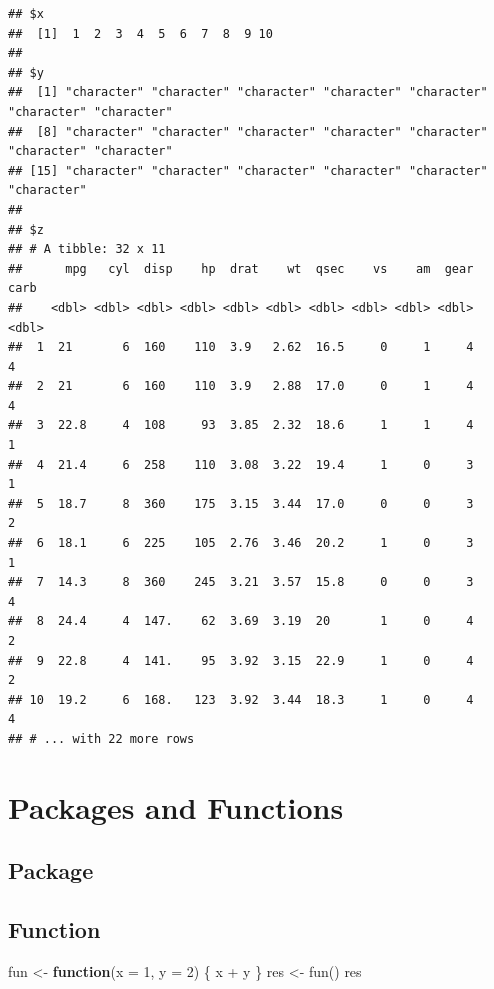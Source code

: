 \documentclass[
]{article}
\newenvironment{Shaded}{\begin{snugshade}}{\end{snugshade}}
\newcommand{\AttributeTok}[1]{\textcolor[rgb]{0.77,0.63,0.00}{#1}}
\newcommand{\ControlFlowTok}[1]{\textcolor[rgb]{0.13,0.29,0.53}{\textbf{#1}}}
\newcommand{\DecValTok}[1]{\textcolor[rgb]{0.00,0.00,0.81}{#1}}
\newcommand{\FunctionTok}[1]{\textcolor[rgb]{0.00,0.00,0.00}{#1}}
\newcommand{\NormalTok}[1]{#1}
\newcommand{\OtherTok}[1]{\textcolor[rgb]{0.56,0.35,0.01}{#1}}
\newcommand{\SpecialCharTok}[1]{\textcolor[rgb]{0.00,0.00,0.00}{#1}}
\begin{document}
\begin{verbatim}
## $x
##  [1]  1  2  3  4  5  6  7  8  9 10
## 
## $y
##  [1] "character" "character" "character" "character" "character" "character" "character"
##  [8] "character" "character" "character" "character" "character" "character" "character"
## [15] "character" "character" "character" "character" "character" "character"
## 
## $z
## # A tibble: 32 x 11
##      mpg   cyl  disp    hp  drat    wt  qsec    vs    am  gear  carb
##    <dbl> <dbl> <dbl> <dbl> <dbl> <dbl> <dbl> <dbl> <dbl> <dbl> <dbl>
##  1  21       6  160    110  3.9   2.62  16.5     0     1     4     4
##  2  21       6  160    110  3.9   2.88  17.0     0     1     4     4
##  3  22.8     4  108     93  3.85  2.32  18.6     1     1     4     1
##  4  21.4     6  258    110  3.08  3.22  19.4     1     0     3     1
##  5  18.7     8  360    175  3.15  3.44  17.0     0     0     3     2
##  6  18.1     6  225    105  2.76  3.46  20.2     1     0     3     1
##  7  14.3     8  360    245  3.21  3.57  15.8     0     0     3     4
##  8  24.4     4  147.    62  3.69  3.19  20       1     0     4     2
##  9  22.8     4  141.    95  3.92  3.15  22.9     1     0     4     2
## 10  19.2     6  168.   123  3.92  3.44  18.3     1     0     4     4
## # ... with 22 more rows
\end{verbatim}

\hypertarget{packages-and-functions}{%
\section{Packages and Functions}\label{packages-and-functions}}

\hypertarget{package}{%
\subsection{Package}\label{package}}

\hypertarget{function}{%
\subsection{Function}\label{function}}

\begin{Shaded}
\begin{Highlighting}[]
\NormalTok{fun }\OtherTok{\textless{}{-}} \ControlFlowTok{function}\NormalTok{(}\AttributeTok{x =} \DecValTok{1}\NormalTok{, }\AttributeTok{y =} \DecValTok{2}\NormalTok{) \{}
\NormalTok{  x }\SpecialCharTok{+}\NormalTok{ y}
\NormalTok{\}}
\NormalTok{res }\OtherTok{\textless{}{-}} \FunctionTok{fun}\NormalTok{()}
\NormalTok{res}
\end{Highlighting}
\end{Shaded}
\end{document}
